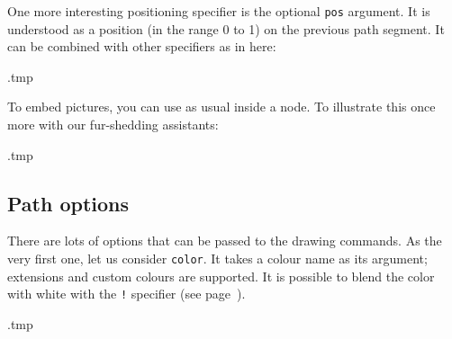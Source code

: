 One more interesting positioning specifier is the optional \verb|pos| argument.
It is understood as a position (in the range 0 to 1) on the previous path segment.
It can be combined with other specifiers as in here:
%
\begin{VerbatimOut}{\jobname.tmp}
\end{VerbatimOut}
\ShowExample

To embed pictures,
you can use  as usual inside a node.
To illustrate this once more with our fur-shedding assistants:
%
\begin{VerbatimOut}{\jobname.tmp}
\centering
\newcommand{\dogfile}{pictures/TheDogs.jpg}
\end{VerbatimOut}
\ShowExampleBelow[2]


%
%
\subsection{Path options}

There are lots of options that can be passed to the drawing commands.
As the very first one, let us consider \verb|color|.
It takes a colour name as its argument;
 extensions and custom colours are supported.
It is possible to blend the color with white with the \verb|!| specifier
(see page~\pageref{ex:color blending}).
%
\begin{VerbatimOut}{\jobname.tmp}
\end{VerbatimOut}
\ShowExample

